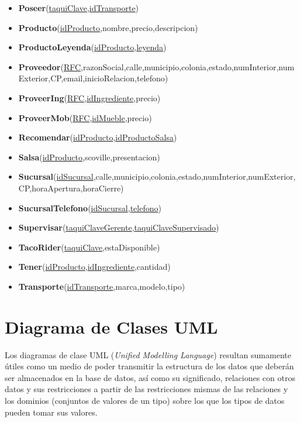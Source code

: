\documentclass[11pt,letterpaper]{article}
\begin{document}
\begin{itemize}
\item \footnotesize{\textbf{Poseer}(\underline{taquiClave},\underline{idTransporte})}
\item \footnotesize{\textbf{Producto}(\underline{idProducto},nombre,precio,descripcion)}
\item \footnotesize{\textbf{ProductoLeyenda}(\underline{idProducto},\underline{leyenda})}
\item \scriptsize{\textbf{Proveedor}(\underline{RFC},razonSocial,calle,municipio,colonia,estado,numInterior,numExterior,CP,email,inicioRelacion,telefono)}
\item \footnotesize{\textbf{ProveerIng}(\underline{RFC},\underline{idIngrediente},precio)}
\item \footnotesize{\textbf{ProveerMob}(\underline{RFC},\underline{idMueble},precio)}
\item \footnotesize{\textbf{Recomendar}(\underline{idProducto},\underline{idProductoSalsa})}
\item \footnotesize{\textbf{Salsa}(\underline{idProducto},scoville,presentacion)}
\item {\footnotesize \textbf{Sucursal}(\underline{idSucursal},calle,municipio,colonia,estado,numInterior,numExterior,CP,horaApertura,horaCierre)}
\item \footnotesize{\textbf{SucursalTelefono}(\underline{idSucursal},\underline{telefono})}
\item \footnotesize{\textbf{Supervisar}(\underline{taquiClaveGerente},\underline{taquiClaveSupervisado})}
\item \footnotesize{\textbf{TacoRider}(\underline{taquiClave},estaDisponible)}
\item \footnotesize{\textbf{Tener}(\underline{idProducto},\underline{idIngrediente},cantidad)}
\item \footnotesize{\textbf{Transporte}(\underline{idTransporte},marca,modelo,tipo)}



\end{itemize}
\section{Diagrama de Clases UML}

Los diagramas de clase UML (\textit{Unified Modelling Language}) resultan sumamente útiles como un medio de poder transmitir la estructura de los datos que deberán ser almacenados en la base de datos, así como su significado, relaciones con otros datos y sus restricciones a partir de las restricciones mismas de las relaciones y los dominios (conjuntos de valores de un tipo) sobre los que los tipos de datos pueden
tomar sus valores.\\
\end{document}

